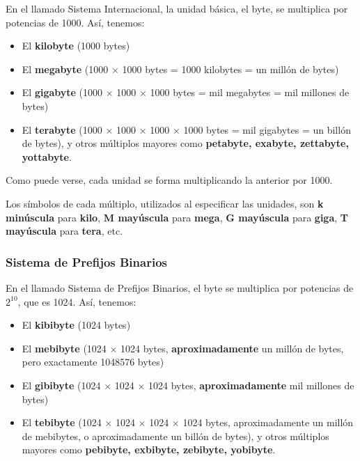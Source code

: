 \documentclass[spanish,a4paper,]{article}
\providecommand{\tightlist}{%
  \setlength{\itemsep}{0pt}\setlength{\parskip}{0pt}}
\begin{document}
En el llamado Sistema Internacional, la unidad básica, el byte, se
multiplica por potencias de 1000. Así, tenemos:

\begin{itemize}
\tightlist
\item
  El \textbf{kilobyte} (1000 bytes)
\item
  El \textbf{megabyte} (1000 \(\times\) 1000 bytes = 1000 kilobytes = un
  millón de bytes)
\item
  El \textbf{gigabyte} (1000 \(\times\) 1000 \(\times\) 1000 bytes = mil
  megabytes = mil millones de bytes)
\item
  El \textbf{terabyte} (1000 \(\times\) 1000 \(\times\) 1000 \(\times\)
  1000 bytes = mil gigabytes = un billón de bytes), y otros múltiplos
  mayores como \textbf{petabyte, exabyte, zettabyte, yottabyte}.
\end{itemize}

Como puede verse, cada unidad se forma multiplicando la anterior por
1000.

Los símbolos de cada múltiplo, utilizados al especificar las unidades,
son \textbf{k minúscula} para \textbf{kilo}, \textbf{M mayúscula} para
\textbf{mega}, \textbf{G mayúscula} para \textbf{giga}, \textbf{T
mayúscula} para \textbf{tera}, etc.

\hypertarget{sistema-de-prefijos-binarios}{%
\subsubsection{Sistema de Prefijos
Binarios}\label{sistema-de-prefijos-binarios}}

En el llamado Sistema de Prefijos Binarios, el byte se multiplica por
potencias de \(2^{10}\), que es 1024. Así, tenemos:

\begin{itemize}
\tightlist
\item
  El \textbf{kibibyte} (1024 bytes)
\item
  El \textbf{mebibyte} (1024 \(\times\) 1024 bytes,
  \textbf{aproximadamente} un millón de bytes, pero exactamente 1048576
  bytes)
\item
  El \textbf{gibibyte} (1024 \(\times\) 1024 \(\times\) 1024 bytes,
  \textbf{aproximadamente} mil millones de bytes)
\item
  El \textbf{tebibyte} (1024 \(\times\) 1024 \(\times\) 1024 \(\times\)
  1024 bytes, aproximadamente un millón de mebibytes, o aproximadamente
  un billón de bytes), y otros múltiplos mayores como \textbf{pebibyte,
  exbibyte, zebibyte, yobibyte}.
\end{itemize}
\end{document}
